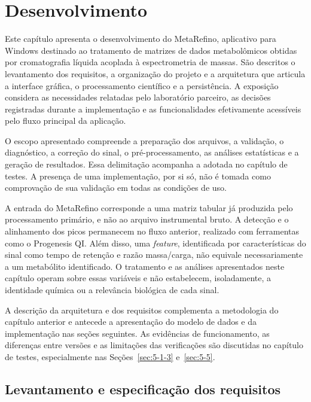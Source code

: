 % 

\chapter[Desenvolvimento]{Desenvolvimento}

Este capítulo apresenta o desenvolvimento do MetaRefino, aplicativo para Windows destinado ao tratamento de matrizes de dados metabolômicos obtidas por cromatografia líquida acoplada à espectrometria de massas. São descritos o levantamento dos requisitos, a organização do projeto e a arquitetura que articula a interface gráfica, o processamento científico e a persistência. A exposição considera as necessidades relatadas pelo laboratório parceiro, as decisões registradas durante a implementação e as funcionalidades efetivamente acessíveis pelo fluxo principal da aplicação.

O escopo apresentado compreende a preparação dos arquivos, a validação, o diagnóstico, a correção do sinal, o pré-processamento, as análises estatísticas e a geração de resultados. Essa delimitação acompanha a adotada no capítulo de testes. A presença de uma implementação, por si só, não é tomada como comprovação de sua validação em todas as condições de uso.

A entrada do MetaRefino corresponde a uma matriz tabular já produzida pelo processamento primário, e não ao arquivo instrumental bruto. A detecção e o alinhamento dos picos permanecem no fluxo anterior, realizado com ferramentas como o Progenesis QI. Além disso, uma \textit{feature}, identificada por características do sinal como tempo de retenção e razão massa/carga, não equivale necessariamente a um metabólito identificado. O tratamento e as análises apresentados neste capítulo operam sobre essas variáveis e não estabelecem, isoladamente, a identidade química ou a relevância biológica de cada sinal.

A descrição da arquitetura e dos requisitos complementa a metodologia do capítulo anterior e antecede a apresentação do modelo de dados e da implementação nas seções seguintes. As evidências de funcionamento, as diferenças entre versões e as limitações das verificações são discutidas no capítulo de testes, especialmente nas Seções~\ref{sec:5-1-3} e~\ref{sec:5-5}.

\section{Levantamento e especificação dos requisitos}
\label{sec:4-requisitos}

